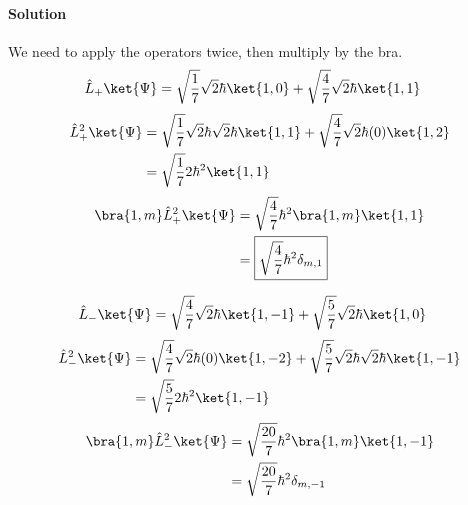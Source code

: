 \documentclass{article}
\begin{document}
\begin{enumerate}
		\paragraph{Solution} We need to apply the operators twice, then multiply by the bra.
		\begin{equation}
			\begin{split}
				\hat{L}_+ \ket{\Psi} &= \sqrt{\frac{1}{7}} \sqrt{2}\hbar \ket{1,0} + \sqrt{\frac{4}{7}} \sqrt{2}\hbar \ket{1,1}
			\end{split}
		\end{equation}
		\begin{equation}
			\begin{aligned}[b]
				\hat{L}^2_+ \ket{\Psi} &= \sqrt{\frac{1}{7}} \sqrt{2}\hbar \sqrt{2}\hbar \ket{1,1} + \sqrt{\frac{4}{7}} \sqrt{2}\hbar (0) \ket{1,2} \\
				&= \sqrt{\frac{1}{7}} 2\hbar^2 \ket{1,1}
			\end{aligned}
		\end{equation}
		\begin{equation}
			\begin{aligned}[b]
				\bra{1,m}\hat{L}^2_+ \ket{\Psi} &= \sqrt{\frac{4}{7}} \hbar^2 \bra{1,m}\ket{1,1} \\
												&= \boxed{\sqrt{\frac{4}{7}} \hbar^2 \delta_{m,1}}
			\end{aligned}
		\end{equation}
		
		\begin{equation}
			\begin{split}
				\hat{L}_- \ket{\Psi} &= \sqrt{\frac{4}{7}} \sqrt{2}\hbar \ket{1,-1} + \sqrt{\frac{5}{7}} \sqrt{2}\hbar \ket{1,0}
			\end{split}
		\end{equation}
		\begin{equation}
			\begin{aligned}[b]
				\hat{L}^2_- \ket{\Psi} &= \sqrt{\frac{4}{7}} \sqrt{2}\hbar (0) \ket{1,-2} + \sqrt{\frac{5}{7}} \sqrt{2}\hbar \sqrt{2}\hbar \ket{1,-1} \\
				&= \sqrt{\frac{5}{7}} 2\hbar^2 \ket{1,-1}
			\end{aligned}
		\end{equation}
		\begin{equation}
			\begin{aligned}[b]
				\bra{1,m}\hat{L}^2_- \ket{\Psi} &= \sqrt{\frac{20}{7}} \hbar^2 \bra{1,m}\ket{1,-1} \\
				&= \sqrt{\frac{20}{7}} \hbar^2 \delta_{m,-1}
			\end{aligned}
		\end{equation}
	\end{enumerate}
	
\end{document}
